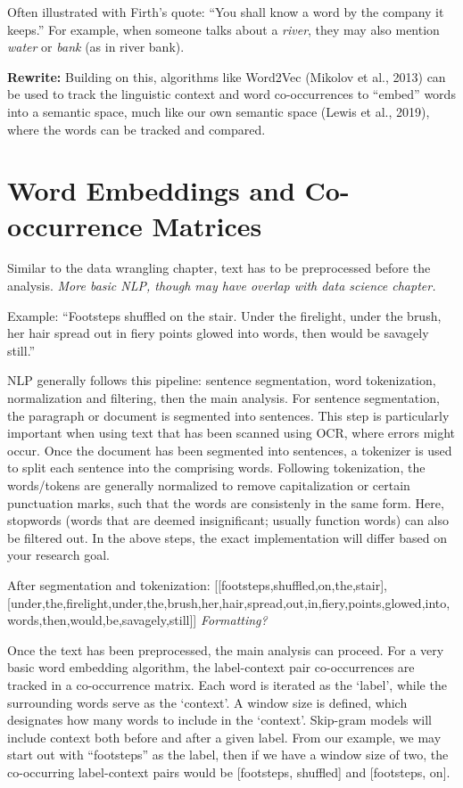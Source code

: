 Often illustrated with Firth's quote: ``You shall know a word by the company it keeps.''
For example, when someone talks about a \textit{river}, they may also mention \textit{water} or \textit{bank} (as in river bank).

\textbf{Rewrite:} Building on this, algorithms like Word2Vec (Mikolov et al., 2013) can be used to track the linguistic context and word co-occurrences to ``embed'' words into a semantic space, much like our own semantic space (Lewis et al., 2019), where the words can be tracked and compared. 


\section{Word Embeddings and Co-occurrence Matrices}

Similar to the data wrangling chapter, text has to be preprocessed before the analysis. \textit{More basic NLP, though may have overlap with data science chapter. }

Example: ``Footsteps shuffled on the stair. Under the firelight, under the brush, her hair spread out in fiery points glowed into words, then would be savagely still.''

NLP generally follows this pipeline: sentence segmentation, word tokenization, normalization and filtering, then the main analysis.
For sentence segmentation, the paragraph or document is segmented into sentences. This step is particularly important when using text that has been scanned using OCR, where errors might occur.
Once the document has been segmented into sentences, a tokenizer is used to split each sentence into the comprising words. 
Following tokenization, the words/tokens are generally normalized to remove capitalization or certain punctuation marks, such that the words are consistenly in the same form.
Here, stopwords (words that are deemed insignificant; usually function words) can also be filtered out.
In the above steps, the exact implementation will differ based on your research goal.

After segmentation and tokenization: [[footsteps,shuffled,on,the,stair], [under,the,firelight,under,the,brush,her,hair,spread,out,in,fiery,points,glowed,into,words,then,would,be,savagely,still]] \textit{Formatting?}

Once the text has been preprocessed, the main analysis can proceed. For a very basic word embedding algorithm, the label-context pair co-occurrences are tracked in a co-occurrence matrix.
Each word is iterated as the `label', while the surrounding words serve as the `context'. A window size is defined, which designates how many words to include in the `context'. Skip-gram models will include context both before and after a given label.
From our example, we may start out with ``footsteps'' as the label, then if we have a window size of two, the co-occurring label-context pairs would be [footsteps, shuffled] and [footsteps, on].

